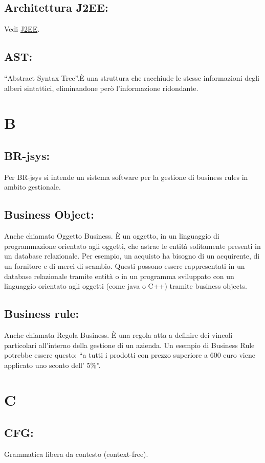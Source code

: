\section{Architettura J2EE:}
Vedi \hyperlink{J2EE}{J2EE}.
\section{AST:} 
``Abstract Syntax Tree''.\`E una struttura che racchiude le stesse informazioni degli alberi sintattici, eliminandone per\`o l'informazione ridondante.

\chapter{B}
\section{BR-jsys:}
Per BR-jsys si intende un sistema software per la gestione di business rules in ambito gestionale.
\hypertarget{Business Object}{}
\section{Business Object:}
Anche chiamato Oggetto Business. \`E un oggetto, in un linguaggio di programmazione orientato agli oggetti, che astrae le entit\`a solitamente presenti in un database relazionale.
Per esempio, un acquisto ha bisogno di un acquirente, di un fornitore e di merci di scambio. Questi possono essere rappresentati in un database relazionale tramite entit\`a o in un programma sviluppato con un linguaggio orientato agli oggetti (come java o C++) tramite business objects.
\hypertarget{Business Rule}{}
\section{Business rule:}
Anche chiamata Regola Business. \`E una regola atta a definire dei vincoli particolari all'interno della gestione di un azienda. Un esempio di Business Rule potrebbe essere questo: ``a tutti i prodotti con prezzo superiore a 600 euro  viene applicato uno sconto dell' 5\%''.

\chapter{C}
\section{CFG:}
Grammatica libera da contesto (context-free). 
